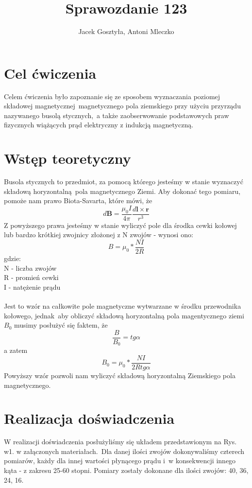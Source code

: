 \documentclass[11pt]{article}
\begin{document}
\title{Sprawozdanie 123}
\author{Jacek Gosztyła, Antoni Mleczko}
\maketitle
\section{Cel ćwiczenia} 
Celem ćwiczenia było zapoznanie się ze sposobem wyznaczania poziomej składowej magnetycznej\
magnetycznego pola ziemskiego przy użyciu przyrządu nazywanego busolą stycznych,\
a także zaobserwowanie podstawowych praw fizycznych wiążących prąd elektryczny z indukcją magnetyczną.
\section{Wstęp teoretyczny}
Busola stycznych to przedmiot, za pomocą którego jesteśmy w stanie wyznaczyć składową horyzontalną\
pola magnetycznego Ziemi. Aby dokonać tego pomiaru, pomoże nam prawo Biota-Savarta, które mówi, że\
$$ d\mathbf B = \frac{\mu_{0}I}{4\pi}\frac{d\mathbf{l} \times \mathbf{r}}{r^{3}} $$
Z powyższego prawa jesteśmy w stanie wyliczyć pole dla środka cewki kołowej lub bardzo krótkiej zwojnicy złożonej z N zwojów - wynosi ono:
$$ B = \mu_{0} * \frac{NI}{2R} $$
gdzie: \\
N - liczba zwojów\\
R - promień cewki\\
I - natężenie prądu\\
\\
Jest to wzór na całkowite pole magnetyczne wytwarzane w środku przewodnika kołowego, jednak\
aby obliczyć składową horyzontalną pola magentycznego ziemi $B_{0}$ musimy posłużyć się faktem, że\
$$\frac{B}{B_{0}} = tg\alpha$$
a zatem
$$ B_{0} = \mu_{0} * \frac{NI}{2Rtg\alpha} $$
Powyższy wzór pozwoli nam wyliczyć składową horyzontalną Ziemskiego pola magnetycznego.
\section{Realizacja doświadczenia}
W realizacji doświadczenia posłużyliśmy się układem przedstawionym na Rys. w1. w załączonych materiałach.\
Dla danej ilości zwojów dokonywaliśmy czterech pomiarów, każdy dla innej wartości płynącego prądu i\
w konsekwencji innego kąta - z zakresu 25-60 stopni. Pomiary zostały dokonane dla ilości zwojów: 40, 36, 24, 16.
\end{document}
